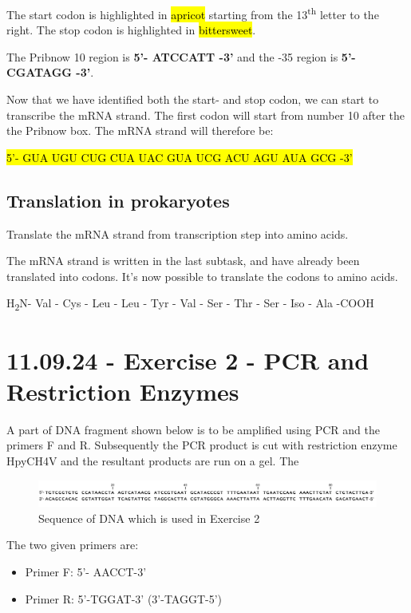 The start codon is highlighted in \hl{apricot} starting from the 13\textsuperscript{th} letter to the right. The stop codon is highlighted in \hl{bittersweet}.


The Pribnow 10 region is \textbf{5’- ATCCATT -3’} and the -35 region is \textbf{5’- CGATAGG -3’}.

Now that we have identified both the start- and stop codon, we can start to transcribe the mRNA strand. The first codon will start from number 10 after the the Pribnow box. The mRNA strand will therefore be: 

\hl{5'- GUA UGU CUG CUA UAC GUA UCG ACU AGU AUA GCG -3'}

\subsection{Translation in prokaryotes}
Translate the mRNA strand from transcription step into amino acids.

\vspace{1em}
The mRNA strand is written in the last subtask, and have already been translated into codons. It's now possible to translate the codons to amino acids.

H\textsubscript{2}N- Val - Cys - Leu - Leu - Tyr - Val - Ser - Thr - Ser - Iso - Ala -COOH

\section{11.09.24 - Exercise 2 - PCR and Restriction Enzymes}
A part of DNA fragment shown below is to be amplified using PCR and the primers F and R.  Subsequently the PCR product is cut with restriction enzyme HpyCH4V and the resultant products are run on a gel. The

\begin{figure}[h]
    \centering
    \includegraphics[width=1\textwidth]{Figures/Exc2DNA.png}
    \caption{Sequence of DNA which is used in Exercise 2}
    \label{fig:Exercise2Seq}
\end{figure}

The two given primers are:
\begin{itemize}
    \item Primer F: 5’- AACCT-3’
    \item Primer R: 5’-TGGAT-3’ (3'-TAGGT-5')
\end{itemize}


